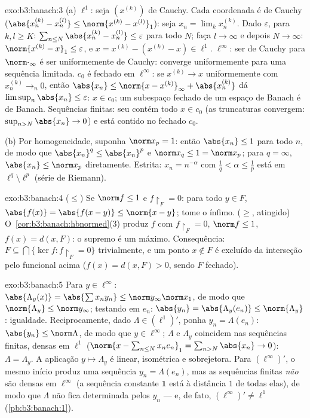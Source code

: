 \begin{solution}{exo:b3:banach:3}
(a) $\ell^1$: seja $(x^{(k)})$ de Cauchy. Cada coordenada é
de Cauchy ($\abs{x^{(k)}_n - x^{(l)}_n} \leq \norm{x^{(k)} -
x^{(l)}}_1$): seja $x_n = \lim_kx^{(k)}_n$. Dado $\varepsilon$,
para $k, l \geq K$: $\sum_{n \leq N}\abs{x^{(k)}_n - x^{(l)}_n}
\leq \varepsilon$ para todo $N$; faça $l \to \infty$ e depois $N \to
\infty$: $\norm{x^{(k)} - x}_1 \leq \varepsilon$, e $x =
x^{(k)} - (x^{(k)} - x) \in \ell^1$. $\ell^\infty$: ser de Cauchy para
$\norm\cdot_\infty$ é ser uniformemente de Cauchy: converge uniformemente para
uma sequência limitada. $c_0$ é fechado em $\ell^\infty$: se
$x^{(k)} \to x$ uniformemente com $x^{(k)}_n \to_n 0$, então
$\abs{x_n} \leq \norm{x - x^{(k)}}_\infty + \abs{x^{(k)}_n}$
dá $\limsup_n\abs{x_n} \leq \varepsilon$: $x \in c_0$; um
subespaço fechado de um espaço de Banach é de Banach. Sequências finitas:
seu  contém todo $x \in c_0$ (as truncaturas convergem:
$\sup_{n>N}\abs{x_n} \to 0$) e está contido no fechado
$c_0$.

(b) Por homogeneidade, suponha $\norm x_p = 1$: então $\abs{x_n} \leq
1$ para todo $n$, de modo que $\abs{x_n}^q \leq \abs{x_n}^p$ e $\norm
x_q \leq 1 = \norm x_p$; para $q = \infty$, $\abs{x_n} \leq
\norm x_p$ diretamente. Estrita: $x_n = n^{-\alpha}$ com
$\frac1q < \alpha \leq \frac1p$ está em $\ell^q \setminus
\ell^p$ (série de Riemann).
\end{solution}

\begin{solution}{exo:b3:banach:4}
($\leq$) Se $\norm f \leq 1$ e $f\restriction_F = 0$: para
todo $y \in F$, $\abs{f(x)} = \abs{f(x - y)} \leq \norm{x -
y}$; tome o ínfimo. ($\geq$, atingido)
O~\cref{cor:b3:banach:hbnormed}(3) produz $f$ com
$f\restriction_F = 0$, $\norm f \leq 1$, $f(x) = d(x, F)$: o
supremo é um máximo. Consequência: $F \subseteq \bigcap\{\ker
f : f\restriction_F = 0\}$ trivialmente, e um ponto $x \notin F$
é excluído da interseção pelo funcional acima
($f(x) = d(x,F) > 0$, sendo $F$ fechado).
\end{solution}

\begin{solution}{exo:b3:banach:5}
Para $y \in \ell^\infty$: $\abs{\Lambda_y(x)} =
\abs{\sum x_ny_n} \leq \norm y_\infty\norm x_1$, de modo que
$\norm{\Lambda_y} \leq \norm y_\infty$; testando em $e_n$:
$\abs{y_n} = \abs{\Lambda_y(e_n)} \leq \norm{\Lambda_y}$:
igualdade. Reciprocamente, dado $\Lambda \in (\ell^1)'$, ponha $y_n =
\Lambda(e_n)$: $\abs{y_n} \leq \norm\Lambda$, de modo que $y \in
\ell^\infty$; $\Lambda$ e $\Lambda_y$ coincidem nas sequências
finitas, densas em $\ell^1$ ($\norm{x - \sum_{n\leq
N}x_ne_n}_1 = \sum_{n>N}\abs{x_n} \to 0$): $\Lambda =
\Lambda_y$. A aplicação $y \mapsto \Lambda_y$ é linear, isométrica e
sobrejetora. Para $(\ell^\infty)'$, o mesmo início produz uma sequência
$y_n = \Lambda(e_n)$, mas as sequências finitas \emph{não} são densas
em $\ell^\infty$
(a sequência constante $\mathbf 1$ está à distância $1$ de todas
elas), de modo que $\Lambda$ não fica determinada pelos $y_n$ --- e,
de fato, $(\ell^\infty)' \neq \ell^1$
(\cref{pb:b3:banach:1}).
\end{solution}

